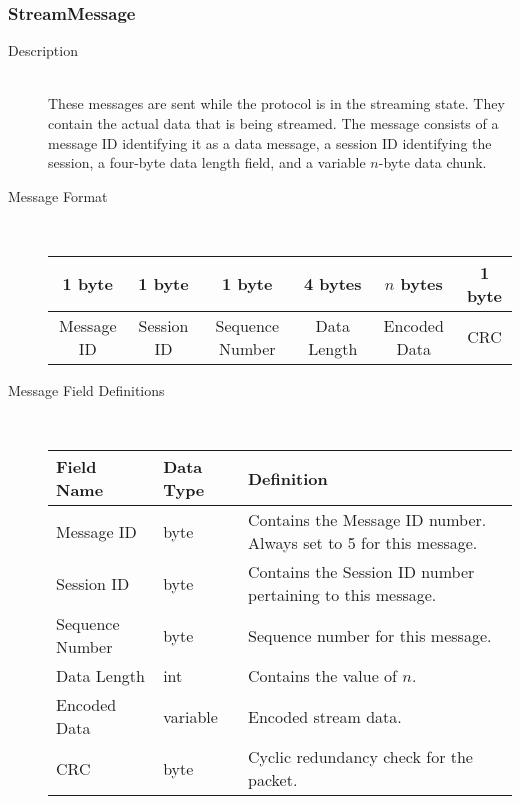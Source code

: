 \documentclass[12pt,letterpaper,titlepage]{article}
\begin{document}
\subsubsection{StreamMessage}
	\begin{description}
	\item[Description] \hfill \\
		These messages are sent while the protocol is in the streaming state. They contain the 
		actual data that is being streamed. The message consists of a message ID identifying it as a data message, a session ID identifying the session, a four-byte data length field, and a variable $n$-byte data chunk.
	\item[Message Format] \hfill \\
	\begin{tabular}{ | c | c | c | c | c | c | }
		\hline
		1 byte & 1 byte & 1 byte & 4 bytes & $n$ bytes & 1 byte \\
		\hline
		Message ID & Session ID & Sequence Number & Data Length & Encoded Data & CRC \\
		\hline
	\end{tabular}
	\item[Message Field Definitions] \hfill \\
	\begin{tabular}{ | p{3cm} | p{1cm} | p{8cm} | }
		\hline
		Field Name & Data Type & Definition \\
		\hline
		Message ID & byte & Contains the Message ID number. 
					\newline Always set to 5 for this message. \\
		\hline
		Session ID & byte & Contains the Session ID number pertaining to this message. \\
        \hline
        Sequence Number & byte & Sequence number for this message. \\
		\hline
		Data Length & int & Contains the value of $n$. \\
		\hline
        Encoded Data & variable & Encoded stream data. \\
        \hline
        CRC & byte & Cyclic redundancy check for the packet. \\
        \hline
	\end{tabular}
	\end{description}
\end{document}
